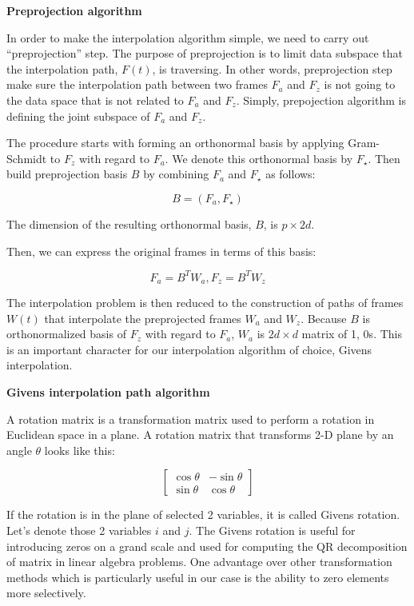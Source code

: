\textbf{Preprojection algorithm}

In order to make the interpolation algorithm simple, we need to carry
out ``preprojection'' step. The purpose of preprojection is to limit
data subspace that the interpolation path, \(F(t)\), is traversing. In
other words, preprojection step make sure the interpolation path between
two frames \(F_a\) and \(F_z\) is not going to the data space that is
not related to \(F_a\) and \(F_z\). Simply, prepojection algorithm is
defining the joint subspace of \(F_a\) and \(F_z\).

The procedure starts with forming an orthonormal basis by applying
Gram-Schmidt to \(F_z\) with regard to \(F_a\). We denote this
orthonormal basis by \(F_\star\). Then build preprojection basis \(B\)
by combining \(F_a\) and \(F_\star\) as follows:

\[B = (F_a, F_{\star})\]

The dimension of the resulting orthonormal basis, \(B\), is
\(p\times 2d\).

Then, we can express the original frames in terms of this basis:

\[F_a = B^TW_a, F_z = B^TW_z\]

The interpolation problem is then reduced to the construction of paths
of frames \(W(t)\) that interpolate the preprojected frames \(W_a\) and
\(W_z\). Because \(B\) is orthonormalized basis of \(F_z\) with regard
to \(F_a\), \(W_a\) is \(2d\times d\) matrix of 1, 0s. This is an
important character for our interpolation algorithm of choice, Givens
interpolation.

\textbf{Givens interpolation path algorithm}

A rotation matrix is a transformation matrix used to perform a rotation
in Euclidean space in a plane. A rotation matrix that transforms 2-D
plane by an angle \(\theta\) looks like this:

\[ \begin{bmatrix}\cos \theta &-\sin \theta \\\sin \theta &\cos \theta \end{bmatrix} \]

If the rotation is in the plane of selected 2 variables, it is called
Givens rotation. Let's denote those 2 variables \(i\) and \(j\). The
Givens rotation is useful for introducing zeros on a grand scale and
used for computing the QR decomposition of matrix in linear algebra
problems. One advantage over other transformation methods which is
particularly useful in our case is the ability to zero elements more
selectively.

